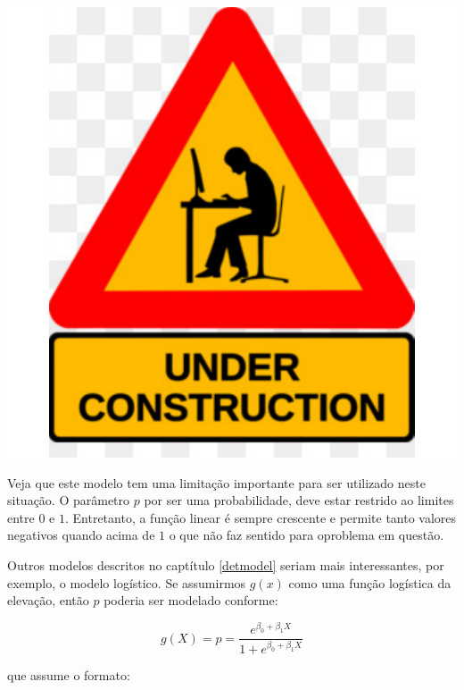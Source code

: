\documentclass[
]{book}
\begin{document}
\begin{center}\includegraphics{probest-cambientais_files/figure-latex/unnamed-chunk-238-1} \end{center}

Veja que este modelo tem uma limitação importante para ser utilizado neste situação. O parâmetro \(p\) por ser uma probabilidade, deve estar restrido ao limites entre \(0\) e \(1\). Entretanto, a função linear é sempre crescente e permite tanto valores negativos quando acima de \(1\) o que não faz sentido para oproblema em questão.

Outros modelos descritos no captítulo \ref{detmodel} seriam mais interessantes, por exemplo, o modelo logístico. Se assumirmos \(g(x)\) como uma função logística da elevação, então \(p\) poderia ser modelado conforme:

\[g(X) = p = \frac{e^{\beta_0 + \beta_1 X}}{1 + e^{\beta_0 + \beta_1 X}}\]

que assume o formato:
\end{document}
